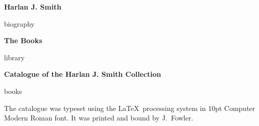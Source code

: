 \documentclass[letterpaper]{book}
\begin{document}
\centerline{\Large \bf Harlan J. Smith}
\bigskip
{biography}
\newpage

\centerline{\Large \bf The Books}
\bigskip
{library}
\newpage

\printbibliography

\mainmatter
\begin{center}
  {\Large \bf Catalogue of the Harlan J. Smith Collection}
\end{center}
\bigskip
{books}

\backmatter
\mbox{}
\cleardoublepage
\begin{colophon}
  The catalogue was typeset using the \LaTeX\ processing system
  in 10pt Computer Modern Roman font. It was printed and bound
  by J.~Fowler.
\end{colophon}
\end{document}
